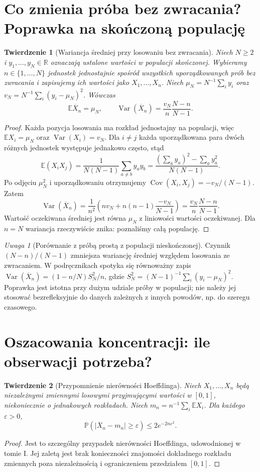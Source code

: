 \documentclass[11pt,a4paper,oneside]{report}
\numberwithin{equation}{chapter}
\theoremstyle{plain}
\newtheorem{twierdzenie}{Twierdzenie}[chapter]
\theoremstyle{definition}
\theoremstyle{remark}
\newtheorem{uwaga}{Uwaga}[chapter]
\newcommand{\R}{\mathbb R}
\newcommand{\Prob}{\mathbb P}
\newcommand{\E}{\mathbb E}
\newcommand{\Var}{\operatorname{Var}}
\newcommand{\Cov}{\operatorname{Cov}}
\newcommand{\abs}[1]{\lvert#1\rvert}
\begin{document}
\section{Co zmienia próba bez zwracania? Poprawka na skończoną populację}\label{sec:fpc}
\begin{twierdzenie}[Wariancja średniej przy losowaniu bez zwracania]\label{thm:fpc}
Niech $N\ge2$ i $y_1,\ldots,y_N\in\R$ oznaczają ustalone wartości w populacji skończonej. Wybieramy $n\in\{1,\ldots,N\}$ jednostek jednostajnie spośród wszystkich uporządkowanych prób bez zwracania i zapisujemy ich wartości jako $X_1,\ldots,X_n$. Niech $\mu_N=N^{-1}\sum_i y_i$ oraz $v_N=N^{-1}\sum_i(y_i-\mu_N)^2$. Wówczas
\[
\E\overline X_n=\mu_N,\qquad
\Var(\overline X_n)=\frac{v_N}{n}\frac{N-n}{N-1}.
\]
\end{twierdzenie}
\begin{proof}
Każda pozycja losowania ma rozkład jednostajny na populacji, więc $\E X_i=\mu_N$ oraz $\Var(X_i)=v_N$. Dla $i\ne j$ każda uporządkowana para dwóch różnych jednostek występuje jednakowo często, stąd
\[
\E(X_iX_j)=\frac1{N(N-1)}\sum_{a\ne b}y_ay_b
=\frac{(\sum_a y_a)^2-\sum_a y_a^2}{N(N-1)}.
\]
Po odjęciu $\mu_N^2$ i uporządkowaniu otrzymujemy $\Cov(X_i,X_j)=-v_N/(N-1)$. Zatem
\[
\Var(\overline X_n)=\frac1{n^2}\left(nv_N+n(n-1)\frac{-v_N}{N-1}\right)
=\frac{v_N}{n}\frac{N-n}{N-1}.
\]
Wartość oczekiwana średniej jest równa $\mu_N$ z liniowości wartości oczekiwanej. Dla $n=N$ wariancja rzeczywiście znika: poznaliśmy całą populację.
\end{proof}

\begin{uwaga}[Porównanie z próbą prostą z populacji nieskończonej]
Czynnik $(N-n)/(N-1)$ zmniejsza wariancję średniej względem losowania ze zwracaniem. W podręcznikach spotyka się równoważny zapis $\Var(\overline X_n)=(1-n/N)S_N^2/n$, gdzie $S_N^2=(N-1)^{-1}\sum_i(y_i-\mu_N)^2$. Poprawka jest istotna przy dużym udziale próby w populacji; nie należy jej stosować bezrefleksyjnie do danych zależnych z innych powodów, np. do szeregu czasowego.
\end{uwaga}

\section{Oszacowania koncentracji: ile obserwacji potrzeba?}
\begin{twierdzenie}[Przypomnienie nierówności Hoeffdinga]\label{thm:hoeffding-demo}
Niech $X_1,\ldots,X_n$ będą niezależnymi zmiennymi losowymi przyjmującymi wartości w $[0,1]$, niekoniecznie o jednakowych rozkładach. Niech $m_n=n^{-1}\sum_i\E X_i$. Dla każdego $\varepsilon>0$,
\[
\Prob\!\left(\abs{\overline X_n-m_n}\ge\varepsilon\right)
\le 2e^{-2n\varepsilon^2}.
\]
\end{twierdzenie}
\begin{proof}
Jest to szczególny przypadek nierówności Hoeffdinga, udowodnionej w tomie I. Jej zaletą jest brak konieczności znajomości dokładnego rozkładu zmiennych poza niezależnością i ograniczeniem przedziałem $[0,1]$.
\end{proof}
\end{document}
